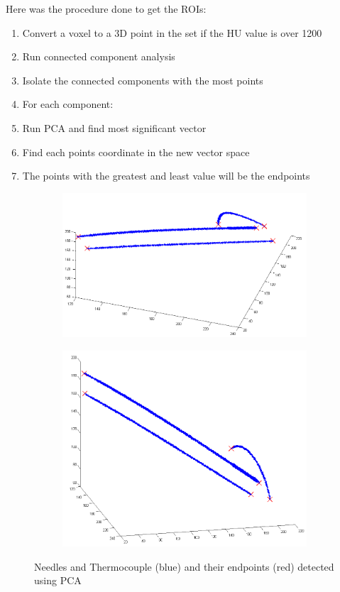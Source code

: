 \documentclass[]{spie}  %
\begin{document}
Here was the procedure done to get the ROIs:
\begin{enumerate}
\item Convert a voxel to a 3D point in the set if the HU value is over 1200
\item Run connected component analysis
\item Isolate the connected components with the most points
\item For each component:
\item Run PCA and find most significant vector
\item Find each points coordinate in the new vector space
\item The points with the greatest and least value will be the endpoints
\end{enumerate}

\begin{figure} 
\centering 
\begin{subfigure}[t]{0.45\textwidth} 
\includegraphics[width=\textwidth]{needleDetection3D_1.png}
\end{subfigure} 
\begin{subfigure}[t]{0.45\textwidth} 
\includegraphics[width=\textwidth]{needleDetection3D_2.png} 
\end{subfigure} 
\caption{Needles and Thermocouple (blue) and their endpoints (red) detected using PCA}
\label{needleDetection} 
\end{figure}
\end{document}
